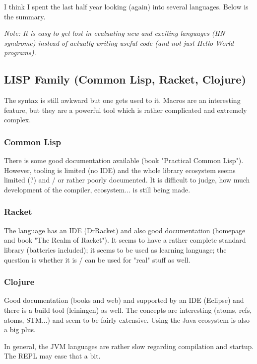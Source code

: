 
I think I spent the last half year looking (again) into several languages. Below is the summary.

\emph{Note: It is easy to get lost in evaluating new and exciting languages (HN syndrome) instead of actually writing useful code (and not just Hello World programs).}

\subsection{LISP Family (Common Lisp, Racket, Clojure)}

The syntax is still awkward but one gets used to it. Macros are an interesting feature, but they are a powerful tool which is rather complicated and extremely complex.

\subsubsection{Common Lisp}

There is some good documentation available (book "Practical Common Lisp"). However, tooling is limited (no IDE) and the whole library ecosystem seems limited (?) and / or rather poorly documented. It is difficult to judge, how much development of the compiler, ecosystem... is still being made.

\subsubsection{Racket}

The language has an IDE (DrRacket) and also good documentation (homepage and book "The Realm of Racket"). It seems to have a rather complete standard library (batteries included); it seems to be used as learning language; the question is whether it is / can be used for "real" stuff as well.

\subsubsection{Clojure}

Good documentation (books and web) and supported by an IDE (Eclipse) and there is a build tool (leiningen) as well. The concepts are interesting (atoms, refs, atoms, STM...) and seem to be fairly extensive. Using the Java ecosystem is also a big plus.

In general, the JVM languages are rather slow regarding compilation and startup. The REPL may ease that a bit.

